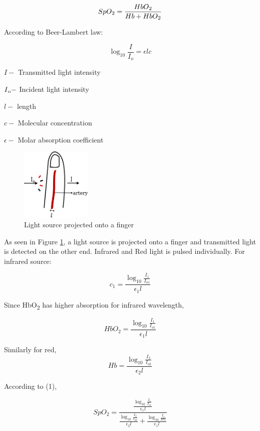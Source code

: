 	\begin{equation}
		SpO\textsubscript{2} = \frac{HbO\textsubscript{2}}{Hb + 	HbO\textsubscript{2}}
	\end{equation}
	
	According to Beer-Lambert law:
	
	\begin{equation}		
		\log_{10}\frac{I}{I_o} = \epsilon l c
	\end{equation}	
	
	$I -$ Transmitted light intensity
	
	$I\textsubscript{o}-$ Incident light intensity
	
	$l -$ length
	
	$c -$ Molecular concentration
	
	$\epsilon -$ Molar absorption coefficient


	\begin{figure}[ht!]
		\centering
		\includegraphics[width=0.3\textwidth]{images/finger_en.png}
		\caption{Light source projected onto a finger}
		\label{fig:finger}
	\end{figure}
	
	As seen in Figure \ref{fig:finger}, a light source is projected onto a finger and transmitted light is detected on the other end. Infrared and Red light is pulsed individually. For infrared source:
	
	\[	
	c_1 = 	\frac{\log_{10}\frac{I_1}{I_{o1}}}{\epsilon_1 l}
	\]	
	
	Since HbO\textsubscript{2} has higher absorption for infrared wavelength,

	\[	
	HbO_2 = \frac{\log_{10}\frac{I_1}{I_{o1}}}{\epsilon_1 	l}
	\]	
	
	Similarly for red,
	\[	
	Hb = \frac{\log_{10}\frac{I_2}{I_{o2}}}{\epsilon_2 	l}
	\]
	
	According to (1),

	\[	
	SpO_2 =  \frac{\frac{\log_{10}\frac{I_1}{I_{o1}}}{\epsilon_1 l}}		
	{\frac{\log_{10}\frac{I_2}{I_{o2}}}{\epsilon_2 l} + 	\frac{\log_{10}\frac{I_1}{I{o1}}}{\epsilon_1 l}}
	\]	
	
